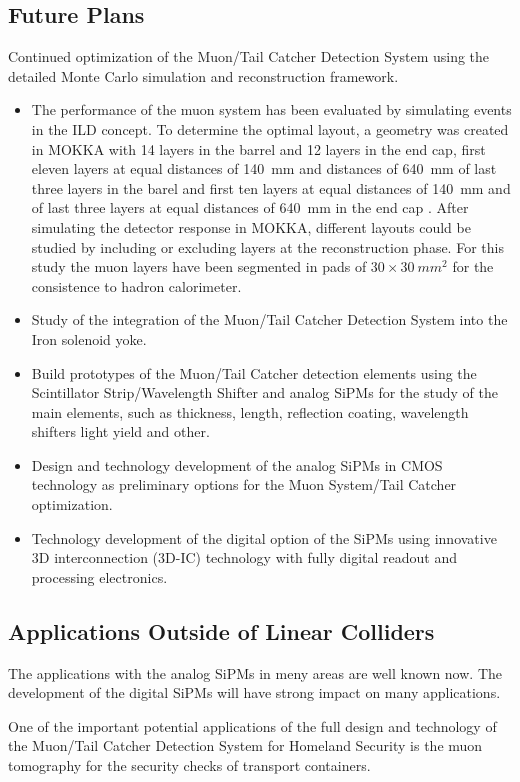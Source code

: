 \subsection{Future Plans}
Continued optimization of the Muon/Tail Catcher Detection System using the detailed Monte Carlo simulation and reconstruction framework.
\begin{itemize}
\item The performance of the muon system has been evaluated by simulating events in the ILD concept. To determine the optimal layout,
a geometry was created in MOKKA with 14 layers in the barrel and 12 layers in the end cap, first eleven layers at equal distances of \SI{140}{mm} and distances of \SI{640}{mm} of last three layers in the barel and first ten layers at equal distances of \SI{140}{mm} and of last three layers at equal distances of \SI{640}{mm} in the end cap . After simulating the detector response in MOKKA, different layouts could be studied by including or excluding layers at the reconstruction phase. For this study the muon layers have been segmented in pads of $30\times\SI{30}{mm^2}$ for the consistence to hadron calorimeter.
\item Study of the integration of the Muon/Tail Catcher Detection System into the Iron solenoid yoke.
\item Build prototypes of the Muon/Tail Catcher detection elements using the Scintillator Strip/Wavelength Shifter and analog SiPMs for the study of the main elements, such as thickness, length, reflection coating, wavelength shifters light yield and other.
\item Design and technology development of the analog SiPMs in CMOS technology as preliminary options for the Muon System/Tail Catcher optimization.
\item Technology development of the digital option of the SiPMs using innovative 3D interconnection (3D-IC) technology with fully digital readout and processing electronics.
\end{itemize}

\subsection{Applications Outside of Linear Colliders}

The applications with the analog SiPMs in meny areas are well known now.
The development of the digital SiPMs will have strong impact on many applications.

One of the important potential applications of the full design and technology of the Muon/Tail Catcher Detection System for Homeland Security is the muon tomography for the security checks of transport containers.

